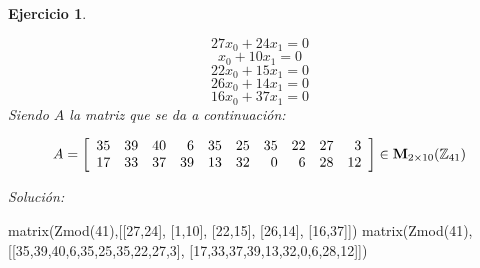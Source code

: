 \documentclass[12pt]{amsart}
\newtheorem{ejer}{Ejercicio}
\begin{document}
\begin{ejer}
\begin{minipage}{\textwidth}
\begin{tcolorbox}[colback = red!20!white,title=Versión Ecuaciones Implícitas]
\[ 27 x_{0} + 24 x_{1} = 0 \]
\[ x_{0} + 10 x_{1} = 0 \]
\[ 22 x_{0} + 15 x_{1} = 0 \]
\[ 26 x_{0} + 14 x_{1} = 0 \]
\[ 16 x_{0} + 37 x_{1} = 0 \]
Siendo $A$ la matriz que se da a continuación:
\end{tcolorbox}
\end{minipage}
\[ A = \left[\begin{array}{rrrrrrrrrr}
35 & 39 & 40 & 6 & 35 & 25 & 35 & 22 & 27 & 3 \\
17 & 33 & 37 & 39 & 13 & 32 & 0 & 6 & 28 & 12
\end{array}\right] \in {\bf M}_{2\times 10}({\mathbb Z}_{41})\]
\end{ejer}

{\it Soluci\'on:}

\begin{sageblock}
matrix(Zmod(41),[[27,24],
[1,10],
[22,15],
[26,14],
[16,37]])
matrix(Zmod(41),[[35,39,40,6,35,25,35,22,27,3],
[17,33,37,39,13,32,0,6,28,12]])
\end{sageblock}

\end{document}
